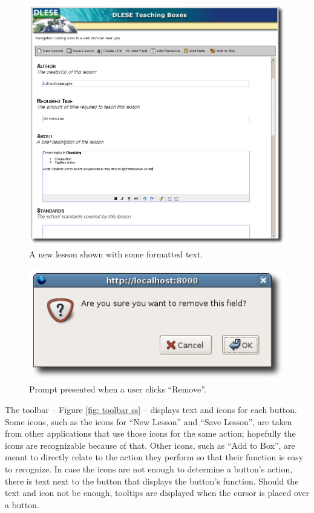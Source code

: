 \documentclass[10pt,letter]{article}
\begin{document}
\begin{figure}[htb]
	\centering
	\includegraphics[width=0.9\linewidth]{figures/formatting}
	\caption{A new lesson shown with some formatted text.}
	\label{fig: blank lesson ss}
\end{figure}

\begin{figure}[htb]
	\centering
	\includegraphics[width=0.45\linewidth]{figures/remove_prompt}
	\caption{Prompt presented when a user clicks ``Remove''.}
	\label{fig: remove prompt ss}
\end{figure}

The toolbar -- Figure \ref{fig: toolbar ss} -- displays text and icons for each
button. Some icons, such as the icons for ``New Lesson'' and ``Save Lesson'',
are taken from other applications that use those icons for the same action;
hopefully the icons are recognizable because of that. Other icons, such as ``Add
to Box'', are meant to directly relate to the action they perform so that their
function is easy to recognize. In case the icons are not enough to determine a
button's action, there is text next to the button that displays the button's
function. Should the text and icon not be enough, tooltips are displayed when
the cursor is placed over a button.
\end{document}
